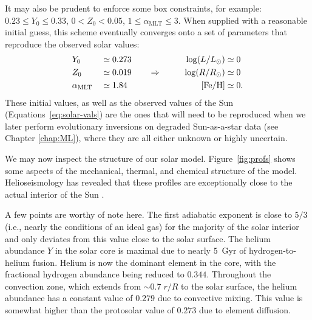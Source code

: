 It may also be prudent to enforce some box constraints, for example: ${0.23 \leq Y_0 \leq 0.33}$, ${0 < Z_0 < 0.05}$, ${1 \leq \alpha_{\text{MLT}} \leq 3}$. 
When supplied with a reasonable initial guess, this scheme eventually converges onto a set of parameters that reproduce the observed solar values: 
\begin{alignat}{3} \label{eq:solar-cal-vals} 
    &Y_0 &&\simeq 0.273  &\log(L/L_\odot) &\simeq 0 \notag\\
    &Z_0 &&\simeq 0.019 \qquad\Rightarrow\qquad &\log(R/R_\odot) &\simeq 0\\\notag
    &\alpha_{\text{MLT}} &&\simeq 1.84  &\text{[Fe/H]} &\simeq 0.
\end{alignat}
These initial values, as well as the observed values of the Sun (Equations~\ref{eq:solar-vals}) are the ones that will need to be reproduced when we later perform evolutionary inversions on degraded Sun-as-a-star data (see Chapter \ref{chap:ML}), where they are all either unknown or highly uncertain. 

We may now inspect the structure of our solar model. 
Figure~\ref{fig:profs} shows some aspects of the mechanical, thermal, and chemical structure of the model. 
Helioseismology has revealed that these profiles are exceptionally close to the actual interior of the Sun \citep[see, e.g.,][]{2016lrsp...13....2b}. 

A few points are worthy of note here. 
The first adiabatic exponent is close to ${5/3}$ (i.e., nearly the conditions of an ideal gas) for the majority of the solar interior and only deviates from this value close to the solar surface. 
The helium abundance $Y$ in the solar core is maximal due to nearly $5$~Gyr of hydrogen-to-helium fusion. 
Helium is now the dominant element in the core, with the fractional hydrogen abundance being reduced to $0.344$. 
Throughout the convection zone, which extends from ${\sim 0.7\;{r/R}}$ to the solar surface, the helium abundance has a constant value of $0.279$ due to convective mixing. 
This value is somewhat higher than the protosolar value of $0.273$ due to element diffusion. 

